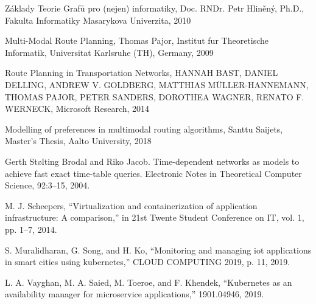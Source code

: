 \documentclass[thesis=M,czech]{FITthesis}[2019/12/23]
\theoremstyle{plain}
\theoremstyle{definition}
\begin{document}
\begin{thebibliography}{9}

	



Základy Teorie Grafů pro (nejen) informatiky, Doc. RNDr. Petr Hliněný, Ph.D., Fakulta Informatiky Masarykova Univerzita, 2010


Multi-Modal Route Planning, Thomas Pajor, Institut fur Theoretische Informatik, Universitat Karlsruhe (TH), Germany, 2009

Route Planning in Transportation Networks, HANNAH BAST, DANIEL DELLING, ANDREW V. GOLDBERG, MATTHIAS MÜLLER-HANNEMANN, THOMAS PAJOR, PETER SANDERS, DOROTHEA WAGNER, RENATO F. WERNECK, Microsoft Research, 2014


Modelling of preferences in multimodal routing algorithms, Santtu Saijets, Master’s Thesis, Aalto University, 2018


Gerth Stølting Brodal and Riko Jacob. Time-dependent networks as models to achieve fast exact time-table queries. Electronic Notes in Theoretical Computer Science, 92:3–15, 2004.



M. J. Scheepers, “Virtualization and containerization of application infrastructure: A comparison,” in 21st Twente Student Conference on IT, vol. 1,
pp. 1–7, 2014.


S. Muralidharan, G. Song, and H. Ko, “Monitoring and managing iot applications in smart cities using kubernetes,” CLOUD COMPUTING 2019,
p. 11, 2019.


L. A. Vayghan, M. A. Saied, M. Toeroe, and F. Khendek, “Kubernetes as an availability manager for microservice applications,” 1901.04946, 2019.


\end{thebibliography}
\end{document}
